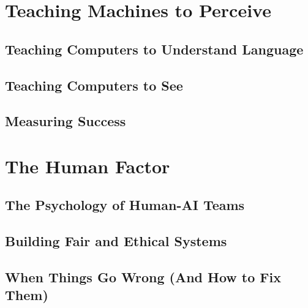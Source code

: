 \documentclass[
11pt,                    %
twoside,                 %
openright,               %
headinclude,             %
footinclude=false,       %
BCOR=12mm,               %
DIV=12,                  %
numbers=noenddot,        %
bibliography=totoc,      %
listof=totoc,            %
]{scrbook}
\begin{document}
	\part{Teaching Machines to Perceive}

	\chapter{Teaching Computers to Understand Language}
	\label{ch:language}
	
	

	\chapter{Teaching Computers to See}
	\label{ch:vision}
	
	

	\chapter{Measuring Success}
	\label{ch:measuring}
	
	

	\part{The Human Factor}

	\chapter{The Psychology of Human-AI Teams}
	\label{ch:psychology}
	
	

	\chapter{Building Fair and Ethical Systems}
	\label{ch:ethics}
	
	

	\chapter{When Things Go Wrong (And How to Fix Them)}
	\label{ch:failures}
	
	
\end{document}

